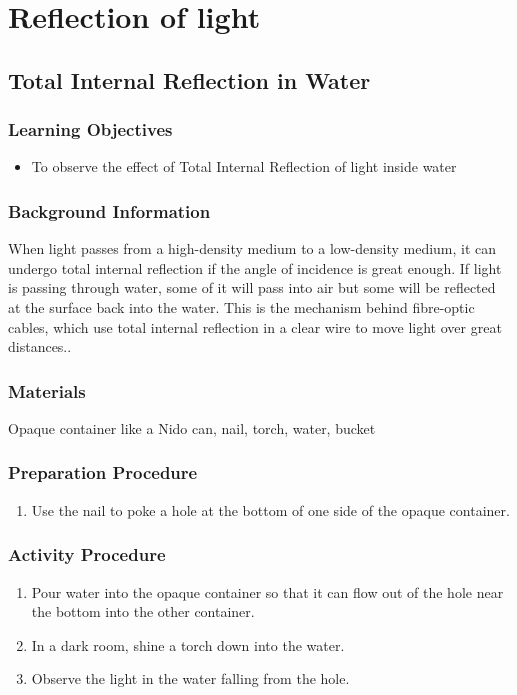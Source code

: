 \section{Reflection of light}

\subsection{Total Internal Reflection in Water}

\subsubsection*{Learning Objectives}
\begin{itemize}
\item{To observe the effect of Total Internal Reflection of light inside water}
\end{itemize}

\subsubsection*{Background Information}
When light passes from a high-density medium to a low-density medium, it can undergo total internal reflection if the angle of incidence is great enough.  If light is passing through water, some of it will pass into air but some will be reflected at the surface back into the water.  This is the mechanism behind fibre-optic cables, which use total internal reflection in a clear wire to move light over great distances..

\subsubsection*{Materials}
Opaque container like a Nido can, nail, torch, water, bucket

\subsubsection*{Preparation Procedure}
\begin{enumerate}
\item{Use the nail to poke a hole at the bottom of one side of the opaque container.}
\end{enumerate}

\subsubsection*{Activity Procedure}
\begin{enumerate}
\item{Pour water into the opaque container so that it can flow out of the hole near the bottom into the other container.}
\item{In a dark room, shine a torch down into the water.}
\item{Observe the light in the water falling from the hole.}
\end{enumerate}

